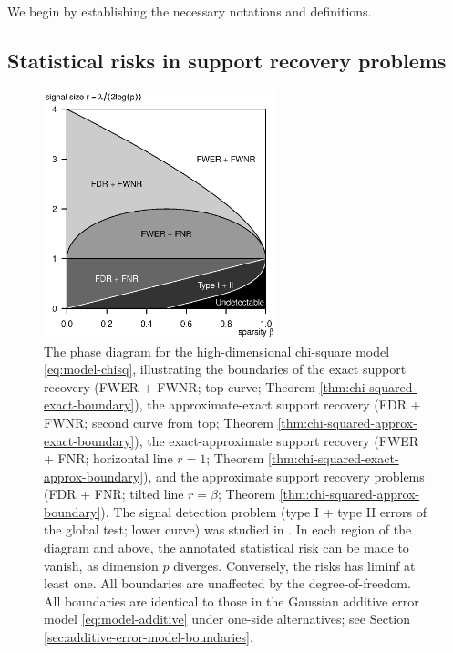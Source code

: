

We begin by establishing the necessary notations and definitions.

\subsection{Statistical risks in support recovery problems}
\label{subsec:risks}

\begin{figure}
      \centering
      \includegraphics[width=0.6\textwidth]{phase_diagram_chisquared_ALL_boundaries.eps}
      \caption{The phase diagram for the high-dimensional chi-square model \eqref{eq:model-chisq}, illustrating the boundaries of the exact support recovery (FWER + FWNR; top curve; Theorem \ref{thm:chi-squared-exact-boundary}),
      the approximate-exact support recovery (FDR + FWNR; second curve from top; Theorem \ref{thm:chi-squared-approx-exact-boundary}),
      the exact-approximate support recovery (FWER + FNR; horizontal line $r=1$; Theorem \ref{thm:chi-squared-exact-approx-boundary}),
      and the approximate support recovery problems (FDR + FNR; tilted line $r=\beta$; Theorem \ref{thm:chi-squared-approx-boundary}).
      The signal detection problem (type I + type II errors of the global test; lower curve) was studied in \citep{donoho2004higher}. 
      In each region of the diagram and above, the annotated statistical risk can be made to vanish, as dimension $p$ diverges. 
      Conversely, the risks has liminf at least one.
      All boundaries are unaffected by the degree-of-freedom.
      All boundaries are identical to those in the Gaussian additive error model \eqref{eq:model-additive} under one-side alternatives; see Section \ref{sec:additive-error-model-boundaries}.
      } 
      \label{fig:phase-chi-squared}
\end{figure}


